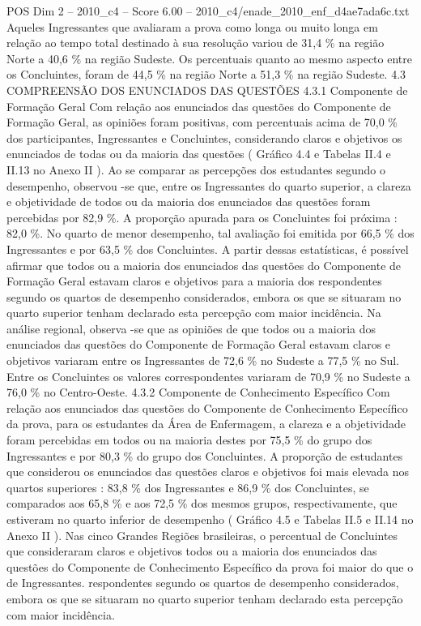\begin{textsample}{POS Dim 2 – 2010\_c4 – Score 6.00 – 2010\_c4/enade\_2010\_enf\_d4ae7ada6c.txt}
Aqueles Ingressantes que avaliaram a prova como longa ou muito longa em relação ao tempo total destinado à sua resolução variou de 31,4 \% na região Norte a 40,6 \% na região Sudeste.
Os percentuais quanto ao mesmo aspecto entre os Concluintes, foram de 44,5 \% na região Norte a 51,3 \% na região Sudeste. 4.3 COMPREENSÃO DOS ENUNCIADOS DAS QUESTÕES 4.3.1 Componente de Formação Geral Com relação aos enunciados das questões do Componente de Formação Geral, as opiniões foram positivas, com percentuais acima de 70,0 \% dos participantes, Ingressantes e Concluintes, considerando claros e objetivos os enunciados de todas ou da maioria das questões ( Gráfico 4.4 e Tabelas II.4 e II.13 no Anexo II ).
Ao se comparar as percepções dos estudantes segundo o desempenho, observou -se que, entre os Ingressantes do quarto superior, a clareza e objetividade de todos ou da maioria dos enunciados das questões foram percebidas por 82,9 \%.
A proporção apurada para os Concluintes foi próxima : 82,0 \%.
No quarto de menor desempenho, tal avaliação foi emitida por 66,5 \% dos Ingressantes e por 63,5 \% dos Concluintes.
A partir dessas estatísticas, é possível afirmar que todos ou a maioria dos enunciados das questões do Componente de Formação Geral estavam claros e objetivos para a maioria dos respondentes segundo os quartos de desempenho considerados, embora os que se situaram no quarto superior tenham declarado esta percepção com maior incidência.
Na análise regional, observa -se que as opiniões de que todos ou a maioria dos enunciados das questões do Componente de Formação Geral estavam claros e objetivos variaram entre os Ingressantes de 72,6 \% no Sudeste a 77,5 \% no Sul.
Entre os Concluintes os valores correspondentes variaram de 70,9 \% no Sudeste a 76,0 \% no Centro-Oeste. 4.3.2 Componente de Conhecimento Específico Com relação aos enunciados das questões do Componente de Conhecimento Específico da prova, para os estudantes da Área de Enfermagem, a clareza e a objetividade foram percebidas em todos ou na maioria destes por 75,5 \% do grupo dos Ingressantes e por 80,3 \% do grupo dos Concluintes.
A proporção de estudantes que considerou os enunciados das questões claros e objetivos foi mais elevada nos quartos superiores : 83,8 \% dos Ingressantes e 86,9 \% dos Concluintes, se comparados aos 65,8 \% e aos 72,5 \% dos mesmos grupos, respectivamente, que estiveram no quarto inferior de desempenho ( Gráfico 4.5 e Tabelas II.5 e II.14 no Anexo II ).
Nas cinco Grandes Regiões brasileiras, o percentual de Concluintes que consideraram claros e objetivos todos ou a maioria dos enunciados das questões do Componente de Conhecimento Específico da prova foi maior do que o de Ingressantes. respondentes segundo os quartos de desempenho considerados, embora os que se situaram no quarto superior tenham declarado esta percepção com maior incidência.

\end{textsample}
